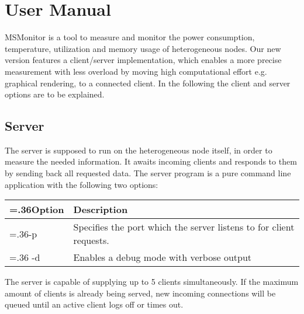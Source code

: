 %
%
%
%
%
%

\section{User Manual}\label{sec:UserManual}
MSMonitor is a tool to measure and monitor the power consumption, temperature, utilization and memory usage of heterogeneous nodes. Our new version features a client/server implementation, which enables a more precise measurement with less overload by moving high computational effort e.g. graphical rendering,  to a connected client.
In the following the client and server options are to be explained. 

\subsection{Server}
The server is supposed to run on the heterogeneous node itself, in order to measure the needed information. It awaits incoming clients and responds to them by sending back all requested data. The server program is a pure command line application with the following two options:\newline
\begin{center}
	\begin{tabularx}{.9\textwidth}{|>{\hsize=.36\textwidth}X|X|}
		\hline
		\textbf{Option} & \textbf{Description} \\ \hline
		-p & Specifies the port which the server listens to for client requests.\\ \hline
		-d & Enables a debug mode with verbose output\\ \hline
	\end{tabularx}
\end{center}
The server is capable of supplying up to 5 clients simultaneously. If the maximum amount of clients is already being served, new incoming connections will be queued until an active client logs off or times out.

